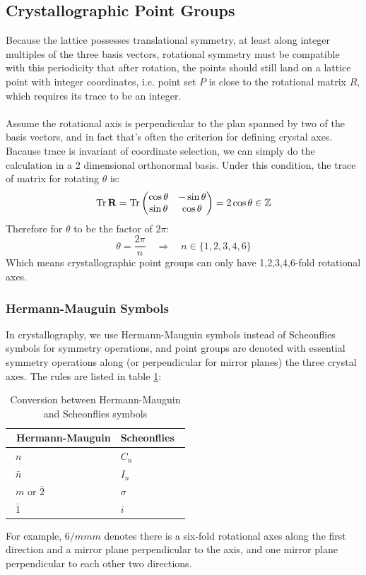 \subsection{Crystallographic Point Groups}
%
Because the lattice possesses translational symmetry, at least along integer multiples of the three basis vectors, 
rotational symmetry must be compatible with this periodicity that after rotation, 
the points should still land on a lattice point with integer coordinates, 
i.e. point set $P$ is close to the rotational matrix $R$, which requires its trace to be an integer.\\ \\
%
Assume the rotational axis is perpendicular to the plan spanned by two of the basis vectors, 
and in fact that's often the criterion for defining crystal axes. 
Bacause trace is invariant of coordinate selection, we can simply do the calculation in a 2 dimensional orthonormal basis.
Under this condition, the trace of matrix for rotating $\theta$ is:
%
\[
	\Tr\mathbf{R} = \Tr
	\begin{pmatrix}
		\cos\theta	&	-\sin\theta	\\
		\sin\theta	&	 \cos\theta
	\end{pmatrix} = 
	2\cos\theta\in\mathbb{Z}
\]
%
Therefore for $\theta$ to be the factor of $2\pi$:
\[
	\theta=\frac{2\pi}{n} 
	\quad\Rightarrow\quad 
	n\in\{1,2,3,4,6\}
\]
%
Which means crystallographic point groups can only have 1,2,3,4,6-fold rotational axes.
%
\subsubsection{Hermann-Mauguin Symbols}
%
In crystallography, we use Hermann-Mauguin symbols instead of Scheonflies symbols for symmetry operations, 
and point groups are denoted with essential symmetry operations along 
(or perpendicular for mirror planes) the three crystal axes. 
The rules are listed in table \ref{convert}:
%
\begin{table}
	\centering
	\begin{tabular}{@{}ll@{}}
		\toprule
		\ \textbf{Hermann-Mauguin} 	& \textbf{Scheonflies}\ 	\\
		\midrule
		\ $n$ 						& $C_n$						\\
		\ $\bar{n}$ 				& $I_n$						\\
		\ $m$ or $\bar{2}$ 			& $\sigma$					\\
		\ $\bar{1}$ 				& $i$						\\
	\bottomrule
	\end{tabular}
	\caption{Conversion between Hermann-Mauguin and Scheonflies symbols}
	\label{convert}
\end{table}
%
For example, $6/mmm$ denotes there is a six-fold rotational axes along the first direction 
and a mirror plane perpendicular to the axis, and one mirror plane perpendicular to each other two directions.
%
